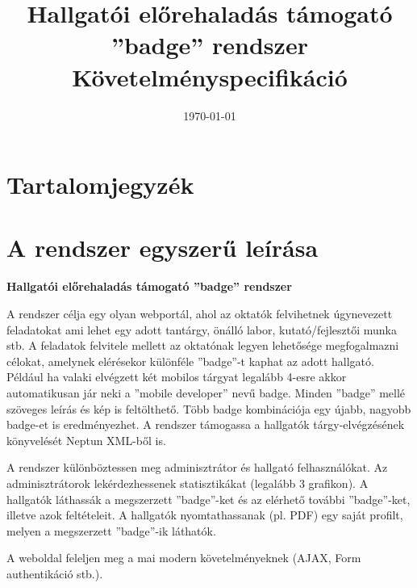 \documentclass[a4paper,10pt,titlepage]{article}
\newcommand{\szerzo}{}
\newcommand{\cim}{Hallgatói előrehaladás támogató ''badge'' rendszer \\ Követelményspecifikáció}
\begin{document}


\begin{titlepage}

\title{\cim}
\author{\szerzo}
\date{\today}

\end{titlepage}
\maketitle

\section*{Tartalomjegyzék}
\makeatletter
{}
\makeatother

\newpage

\section{A rendszer egyszerű leírása}

\begin{center}
\textbf{Hallgatói előrehaladás támogató ''badge'' rendszer}
\end{center}

A rendszer célja egy olyan webportál, ahol az oktatók felvihetnek úgynevezett feladatokat ami lehet egy adott tantárgy, önálló labor, kutató/fejlesztői munka stb. A feladatok felvitele mellett az oktatónak legyen lehetősége megfogalmazni célokat, amelynek elérésekor különféle ''badge''-t kaphat az adott hallgató. Például ha valaki elvégzett két mobilos tárgyat legalább 4-esre akkor automatikusan jár neki a ''mobile developer'' nevű badge. Minden ''badge'' mellé szöveges leírás és kép is feltölthető. Több badge kombinációja egy újabb, nagyobb badge-et is eredményezhet. A rendszer támogassa a hallgatók tárgy-elvégzésének könyvelését Neptun XML-ből is.

A rendszer különböztessen meg adminisztrátor és hallgató felhasználókat. Az adminisztrátorok lekérdezhessenek statisztikákat (legalább 3 grafikon). A hallgatók láthassák a megszerzett ''badge''-ket és az elérhető további ''badge''-ket, illetve azok feltételeit. A hallgatók nyomtathassanak (pl. PDF) egy saját profilt, melyen a megszerzett ''badge''-ik láthatók.

A weboldal feleljen meg a mai modern követelményeknek (AJAX, Form authentikáció stb.).
\end{document}
